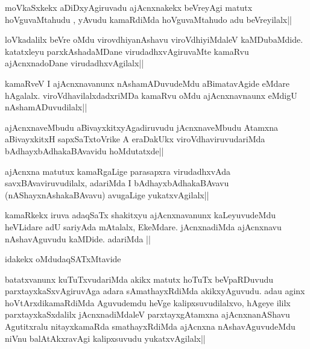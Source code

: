 
\begin{artha}
moVkaSxkekx aDiDxyAgiruvadu ajAcnxnakekx beVreyAgi matutx hoVguvaMtahudu , yAvudu kamaRdiMda hoVguvaMtahudo adu beVreyilalx||
\end{artha}

\begin{artha}
loVkadalilx beVre oMdu virovdhiyanAshavu viroVdhiyiMdaleV kaMDubaMdide. katatxleyu parxkAshadaMDane virudadhxvAgiruvaMte kamaRvu ajAcnxnadoDane virudadhxvAgilalx||
\end{artha}

\begin{artha}
kamaRveV I ajAcnxnavanunx nAshamADuvudeMdu aBimatavAgide eMdare hAgalalx. viroVdhavilalxdadxriMDa kamaRvu oMdu ajAcnxnavnaunx eMdigU nAshamADuvudilalx||
\end{artha}

\begin{artha}
ajAcnxnaveMbudu aBivayxkitxyAgadiruvudu jAcnxnaveMbudu Atamxna aBivayxkitxH sapxSaTxtoVrike A eraDakUkx viroVdhaviruvudariMda bAdhayxbAdhakaBAvavidu hoMdutatxde||
\end{artha}

\begin{artha}
ajAcnxna matutux kamaRgaLige parasapxra virudadhxvAda savxBAvaviruvudilalx, adariMda I bAdhayxbAdhakaBAvavu (nAShayxnAshakaBAvavu) avugaLige yukatxvAgilalx||
\end{artha}

\begin{artha}
kamaRkekx iruva adaqSaTx shakitxyu ajAcnxnavanunx kaLeyuvudeMdu heVLidare adU sariyAda mAtalalx, EkeMdare. jAcnxnadiMda ajAcnxnavu nAshavAguvudu kaMDide. adariMda ||
\end{artha}

\begin{artha}
idakekx oMdudaqSATxMtavide
\end{artha}

\begin{artha}
batatxvanunx kuTuTxvudariMda akikx matutx hoTuTx beVpaRDuvudu parxtayxkaSxvAgiruvAga adara sAmathayxRdiMda akikxyAguvudu. adau aginx hoVtArxdikamaRdiMda Aguvudemdu heVge kalipxsuvudilalxvo, hAgeye ililx parxtayxkaSxdalilx jAcnxnadiMdaleV parxtayxgAtamxna ajAcnxnanAShavu Agutitxralu nitayxkamaRda smathayxRdiMda ajAcnxna nAshavAguvudeMdu niVnu balAtAkxravAgi kalipxsuvudu yukatxvAgilalx||
\end{artha}

